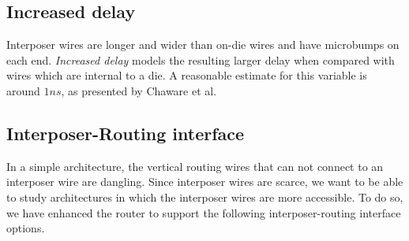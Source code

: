 \documentclass{sig-alternate-2013}
\begin{document}
\subsection{Increased delay}
Interposer wires are longer and wider than on-die wires and have microbumps on each end. \textit{Increased delay} models the resulting larger delay when compared with wires which are internal to a die. A reasonable estimate for this variable is around $1ns$, as presented by Chaware et al\cite{xilinxTSV}.

\subsection{Interposer-Routing interface}
\label{sec:interposer-routing-interface}
In a simple architecture, the vertical routing wires that can not connect to an interposer wire are dangling. Since interposer wires are scarce, we want to be able to study architectures in which the interposer wires are more accessible. To do so, we have enhanced the router to support the following interposer-routing interface options.
\end{document}
